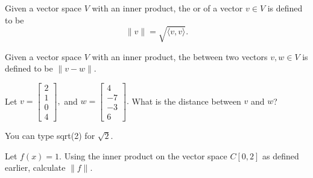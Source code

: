 \endedxtext


\endedxvertical






{} Given a vector space $V$ with an inner product, the {}
or {} of a vector $v\in V$ is defined to be 
\[ \| v\| = \sqrt{\langle v, v \rangle}.\]

{} Given a vector space $V$ with an inner product, the {}
between two vectors $v,w\in V$ is defined to be $\|v-w\|$.  

\endedxtext




Let $v = \left[ \begin{array}{c} 2 \\ 1 \\ 0 \\ 4 \end{array} \right],$
and $w = \left[ \begin{array}{c} 4 \\ -7 \\ -3 \\ 6 \end{array} \right].$
What is the distance between $v$ and $w$?  

You can type sqrt(2) for $\sqrt{2}$.
  



\endedxproblem


Let $f(x) = 1$.  
Using the inner product on the vector space $C[0,2]$ as defined earlier, 
calculate $\|f\|$.  



